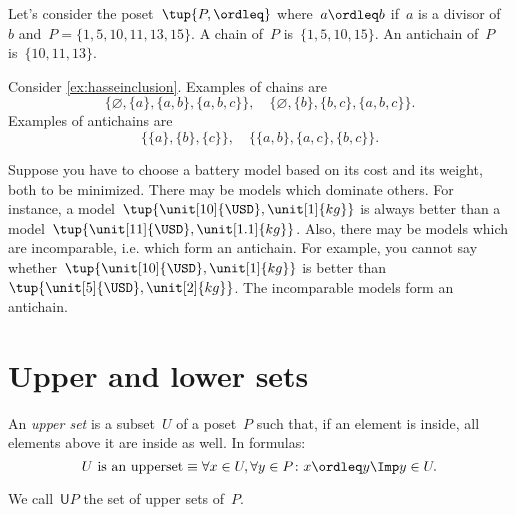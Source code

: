 \begin{example}
    Let's consider the poset~$\tup{P,\ordleq}$ where~$a\ordleq b$ if~$a$ is a divisor of~$b$ and~$P=\{1,5,10,11,13,15\}$. A chain of~$P$ is~$\{1,5,10,15\}$. An antichain of~$P$ is~$\{10,11,13\}$.
\end{example}

\begin{example}
    Consider \cref{ex:hasseinclusion}. Examples of chains are
    \begin{equation}
        \{\varnothing,\{a\},\{a,b\},\{a,b,c\}\}, \quad  \{\varnothing,\{b\},\{b,c\},\{a,b,c\}\}.
    \end{equation}
    Examples of antichains are
    \begin{equation}
        \{\{a\},\{b\},\{c\}\}, \quad \{ \{a,b\},\{a,c\}, \{b,c\}\}.
    \end{equation}
\end{example}

\begin{example}
    \label{ex:battery}
    Suppose you have to choose a battery model based on its cost and its weight, both to be minimized. There may be models which dominate others. For instance, a model~$\tup{\unit[10]{\USD},\unit[1]{kg}}$ is always better than a model~$\tup{\unit[11]{\USD},\unit[1.1]{kg}}$. Also, there may be models which are incomparable, i.e. which form an antichain. For example, you cannot say whether~$\tup{\unit[10]{\USD},\unit[1]{kg}}$ is better than~$\tup{\unit[5]{\USD},\unit[2]{kg}}$. The incomparable models form an antichain.
\end{example}


\section{Upper and lower sets}

\begin{definition}
    \label{def:upperset}
    An \emph{upper set} is a subset~$U$ of a poset~$P$ such
    that, if an element is inside, all elements above it are inside as well.
    In formulas:
    \begin{equation}
        \text{$U$ is an upperset} \equiv \forall x\in U, \forall y\in P\colon x\ordleq y \Imp y\in U.
    \end{equation}
\end{definition}
\begin{remark}
    We call~$\mathsf{U}P$ the set of upper sets of~$P$.
\end{remark}

